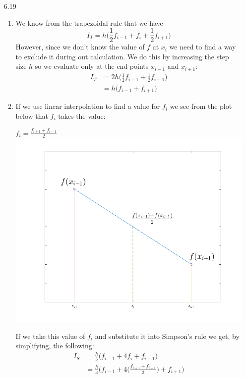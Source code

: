 \documentclass[11pt,a4paper]{article}
\begin{document}
\begin{itemize}
			\item[6.19]
				\begin{enumerate} [label={\alph*)}]
					\item We know from the trapezoidal rule that we have
					$$I_T = h\Big(\frac{1}{2}f_{i-1} + f_i + \frac{1}{2}f_{i+1}\Big)$$ However, since we don't know the value of $f$ at $x_i$ we need to find a way to exclude it during out calculation. We do this by increasing the step size $h$ so we evaluate only at the end points $x_{i-1}$ and $x_{i+1}$:
					\begin{align*}
						I_T &= 2h\Big(\frac{1}{2}f_{i-1} + \frac{1}{2}f_{i+1}\Big) \\
						&= h\Big(f_{i-1} + f_{i+1}\Big)
					\end{align*}					 
					\item If we use linear interpolation to find a value for $f_i$ we see from the plot below that $f_i$ takes the value:
					\begin{center}
						$f_i = \frac{f_{i+1}+f_{i-1}}{2}$ \\
						\includegraphics[width=1\linewidth]{ch6q19b}
					\end{center}
					If we take this value of $f_i$ and substitute it into Simpson's rule we get, by simplifying, the following:
					\begin{align*}
						I_S &= \frac{h}{3}\Big(f_{i-1} + 4f_i + f_{i+1}\Big) \\
						&= \frac{h}{3}\Big(f_{i-1} + 4\big(\frac{f_{i+1}+f_{i-1}}{2}\big) + f_{i+1}\Big) \\

\end{align*}
\end{enumerate}
\end{itemize}
\end{document}
